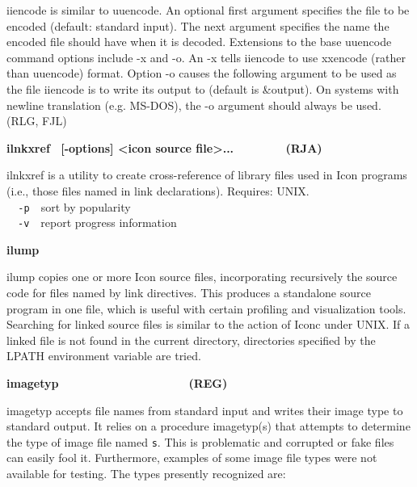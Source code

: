 \textsf{iiencode} is similar to uuencode. An optional first argument
specifies the file to be encoded (default: standard input). The next
argument specifies the name the encoded file should have when it is
decoded. Extensions to the base uuencode command options include
\textsf{{}-x} and \textsf{{}-o}. An \textsf{{}-x} tells
\textsf{iiencode} to use xxencode (rather than uuencode) format. Option
\textsf{{}-o} causes the following argument to be used as the file
\textsf{iiencode} is to write its output to (default is
\textsf{\&output}). On systems with newline translation (e.g. MS-DOS),
the \textsf{{}-o} argument should always be used. (RLG, FJL)

{\sffamily\bfseries
ilnkxref \ \textrm{\textmd{[-options] {\textless}icon source
file{\textgreater}...\ \ \ \ \ \ \ \ }}(RJA)}

\textsf{ilnkxref} is a utility to create
cross-reference of library files used in Icon
programs (i.e., those files named in link declarations).
Requires: UNIX.\\
\texttt{\ \ {}-p}\ \ sort by
{\textquotedbl}popularity{\textquotedbl}\\
\ \ \texttt{{}-v}\ \ report progress information

{\sffamily\bfseries
ilump}

\textsf{ilump} copies one or more Icon source files, incorporating
recursively the source code for files named by link
directives. This produces a standalone source program in one file,
which is useful with certain profiling and visualization tools.
Searching for linked source files is similar to the action of Iconc
under UNIX. If a linked file is not found in the current directory,
directories specified by the LPATH environment variable are tried.

{\sffamily\bfseries
imagetyp\ \ \ \ \ \ \ \ \ \ \ \ \ \ \ \ \ \ \ \ (REG)}

\textsf{imagetyp} accepts file names from standard input and writes
their image type to standard output. It relies on a procedure
\textsf{imagetyp(s)} that attempts to determine the type of image file
named \texttt{s}. This is problematic and corrupted or fake files can
easily fool it. Furthermore, examples of some image file types were not
available for testing. The types presently recognized are:


